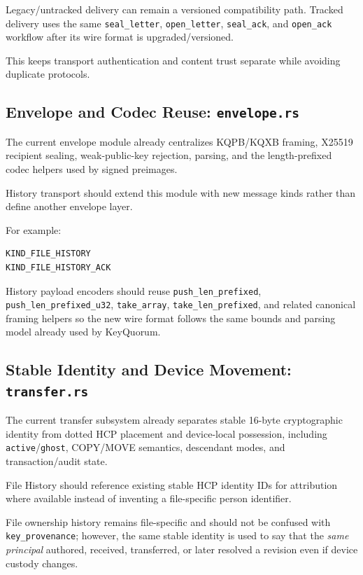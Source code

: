\documentclass[11pt]{article}
\begin{document}
Legacy/untracked delivery can remain a versioned compatibility path. Tracked delivery uses the same \texttt{seal\_letter}, \texttt{open\_letter}, \texttt{seal\_ack}, and \texttt{open\_ack} workflow after its wire format is upgraded/versioned.

This keeps transport authentication and content trust separate while avoiding duplicate protocols.

\subsection{Envelope and Codec Reuse: \texttt{envelope.rs}}

The current envelope module already centralizes KQPB/KQXB framing, X25519 recipient sealing, weak-public-key rejection, parsing, and the length-prefixed codec helpers used by signed preimages.

History transport should extend this module with new message kinds rather than define another envelope layer.

For example:

\begin{lstlisting}
KIND_FILE_HISTORY
KIND_FILE_HISTORY_ACK
\end{lstlisting}

History payload encoders should reuse \texttt{push\_len\_prefixed}, \texttt{push\_len\_prefixed\_u32}, \texttt{take\_array}, \texttt{take\_len\_prefixed}, and related canonical framing helpers so the new wire format follows the same bounds and parsing model already used by KeyQuorum.

\subsection{Stable Identity and Device Movement: \texttt{transfer.rs}}

The current transfer subsystem already separates stable 16-byte cryptographic identity from dotted HCP placement and device-local possession, including \texttt{active}/\texttt{ghost}, COPY/MOVE semantics, descendant modes, and transaction/audit state.

File History should reference existing stable HCP identity IDs for attribution where available instead of inventing a file-specific person identifier.

File ownership history remains file-specific and should not be confused with \texttt{key\_provenance}; however, the same stable identity is used to say that the \emph{same principal} authored, received, transferred, or later resolved a revision even if device custody changes.
\end{document}

